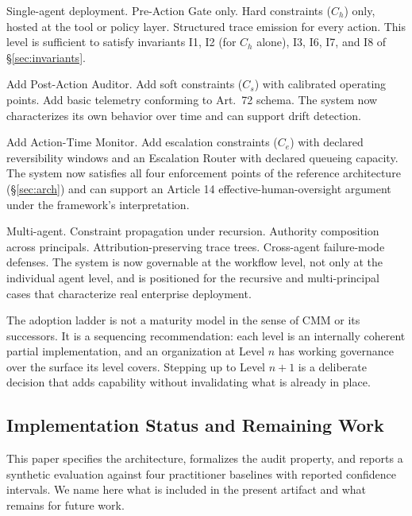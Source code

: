 \documentclass[11pt,a4paper]{article}
\theoremstyle{remark}
\begin{document}
\begin{description}[leftmargin=2.6em,topsep=0.3em,itemsep=0.4em]
\item[\textbf{Level 1, Minimal.}] Single-agent deployment. Pre-Action Gate only. Hard constraints ($C_h$) only, hosted at the tool or policy layer. Structured trace emission for every action. This level is sufficient to satisfy invariants I1, I2 (for $C_h$ alone), I3, I6, I7, and I8 of \S\ref{sec:invariants}.
\item[\textbf{Level 2, Intermediate.}] Add Post-Action Auditor. Add soft constraints ($C_s$) with calibrated operating points. Add basic telemetry conforming to Art.~72 schema. The system now characterizes its own behavior over time and can support drift detection.
\item[\textbf{Level 3, Advanced.}] Add Action-Time Monitor. Add escalation constraints ($C_e$) with declared reversibility windows and an Escalation Router with declared queueing capacity. The system now satisfies all four enforcement points of the reference architecture (\S\ref{sec:arch}) and can support an Article 14 effective-human-oversight argument under the framework's interpretation.
\item[\textbf{Level 4, Full SARC.}] Multi-agent. Constraint propagation under recursion. Authority composition across principals. Attribution-preserving trace trees. Cross-agent failure-mode defenses. The system is now governable at the workflow level, not only at the individual agent level, and is positioned for the recursive and multi-principal cases that characterize real enterprise deployment.
\end{description}

The adoption ladder is not a maturity model in the sense of CMM or its successors. It is a sequencing recommendation: each level is an internally coherent partial implementation, and an organization at Level $n$ has working governance over the surface its level covers. Stepping up to Level $n+1$ is a deliberate decision that adds capability without invalidating what is already in place.

\subsection{Implementation Status and Remaining Work}\label{sec:future-impl}

This paper specifies the architecture, formalizes the audit property, and reports a synthetic evaluation against four practitioner baselines with reported confidence intervals. We name here what is included in the present artifact and what remains for future work.
\end{document}
